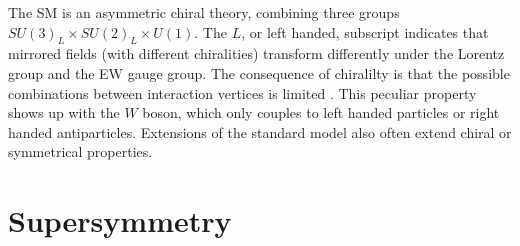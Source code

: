 





The SM is an asymmetric chiral theory, combining three groups $SU(3)_L \times SU(2)_L \times U(1)$. The $L$, or left handed, subscript indicates that mirrored fields (with different chiralities)  transform differently under the Lorentz group and the EW gauge group.  The consequence of chiralilty is that the possible combinations between interaction vertices is limited \cite{Thomson:2013zua}. This peculiar property shows up with the $W$ boson, which only couples to left handed particles or right handed antiparticles. Extensions of the standard model also often extend chiral or symmetrical properties.  %

\section{Supersymmetry}

